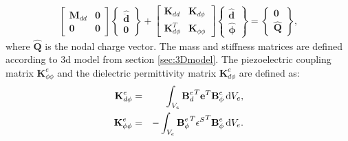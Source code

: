 \begin{eqnarray}
	\left [\begin{array}{cc}
		\textbf{M}_{dd} & \textbf{0}\\
		\textbf{0} & \textbf{0}
	\end{array}\right]
	\left \{\begin{array}{c}
		\widehat{\ddot{\textbf{d}}} \\
		\textbf{0}
	\end{array}\right \} +
	\left [\begin{array}{cc}
		\textbf{K}_{dd} & \textbf{K}_{d \phi}\\
		\textbf{K}_{d \phi}^T & \textbf{K}_{\phi \phi}
	\end{array}\right]
	\left \{\begin{array}{c}
		\widehat{\textbf{d}} \\
		\widehat{\boldsymbol{\phi}}
	\end{array}\right \}  = 
	\left \{\begin{array}{c}
		\textbf{0}\\
		\widehat{\textbf{Q}}
	\end{array}\right \},
	\label{eq:pzt_sem}
\end{eqnarray}
where \(\widehat{\textbf{Q}}\) is the nodal charge vector.
The mass and stiffness matrices are defined according to \ac{3d} model from section \ref{sec:3Dmodel}.
The piezoelectric coupling matrix \(\textbf{K}_{\phi \phi}^e\) and the dielectric permittivity matrix \(\textbf{K}_{d \phi}^e\) are defined as:
\begin{eqnarray}
	\textbf{K}_{d\phi}^e & = & \int_{V_e}{\textbf{B}_d^e}^T\textbf{e}^T \textbf{B}_{\phi}^e \mathop{}\!\mathrm{d} V_e,\\
	\textbf{K}_{\phi \phi}^e & = & -\int_{V_e}{\textbf{B}_{\phi}^e}^T 
	{\textbf{\(\epsilon\)}^S}^T \textbf{B}_{\phi}^e \mathop{}\!\mathrm{d} V_e.
\end{eqnarray}

